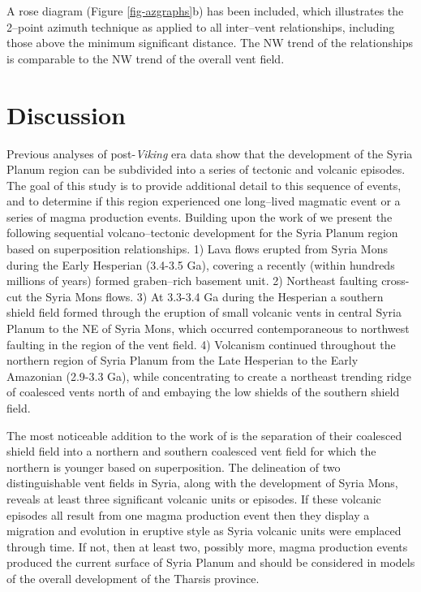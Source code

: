 A rose diagram (Figure \ref{fig-azgraphs}b) has been included, which illustrates the 2--point azimuth technique as applied to all inter--vent relationships, including those above the minimum significant distance. The NW trend of the relationships is comparable to the NW trend of the overall vent field.

\section{Discussion}

Previous analyses of post-\textit{Viking} era data show that the development of the Syria Planum region can be subdivided into a series of tectonic and volcanic episodes. The goal of this study is to provide additional detail to this sequence of events, and to determine if this region experienced one long--lived magmatic event or a series of magma production events. Building upon the work of \citet{Baptista2008} we present the following sequential volcano--tectonic development for the Syria Planum region based on superposition relationships. 1) Lava flows erupted from Syria Mons during the Early Hesperian (3.4-3.5 Ga), covering a recently (within hundreds millions of years) formed graben--rich basement unit. 2) Northeast faulting cross-cut the Syria Mons flows. 3) At 3.3-3.4 Ga during the Hesperian a southern shield field formed through the eruption of small volcanic vents in central Syria Planum to the NE of Syria Mons, which occurred contemporaneous to northwest faulting in the region of the vent field. 4) Volcanism continued throughout the northern region of Syria Planum from the Late Hesperian to the Early Amazonian (2.9-3.3 Ga), while concentrating to create a northeast trending ridge of coalesced vents north of and embaying the low shields of the southern shield field.

The most noticeable addition to the work of \citet{Baptista2008} is the separation of their coalesced shield field into a northern and southern coalesced vent field for which the northern is younger based on superposition. The delineation of two distinguishable vent fields in Syria, along with the development of Syria Mons, reveals at least three significant volcanic units or episodes. If these volcanic episodes all result from one magma production event then they display a migration and evolution in eruptive style as Syria volcanic units were emplaced through time. If not, then at least two, possibly more, magma production events produced the current surface of Syria Planum and should be considered in models of the overall development of the Tharsis province.


